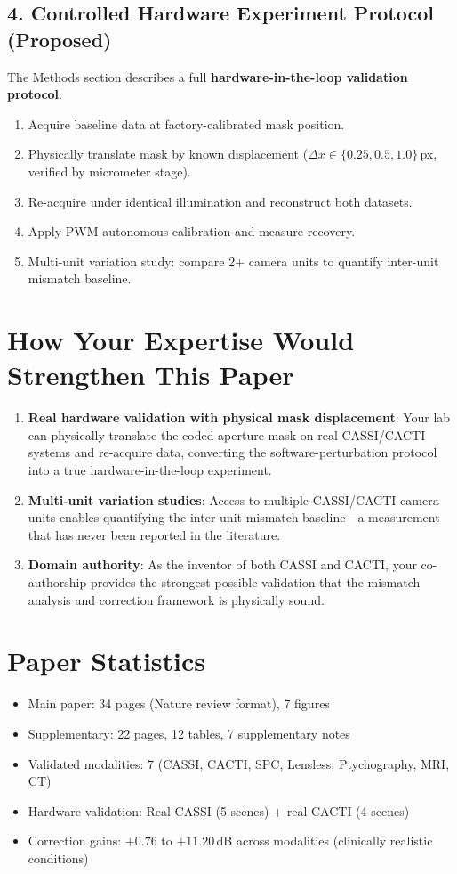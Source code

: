 \documentclass[11pt]{article}
\begin{document}
\subsection*{4. Controlled Hardware Experiment Protocol (Proposed)}

The Methods section describes a full \textbf{hardware-in-the-loop validation protocol}:
\begin{enumerate}
  \item Acquire baseline data at factory-calibrated mask position.
  \item Physically translate mask by known displacement ($\Delta x \in \{0.25, 0.5, 1.0\}$\,px, verified by micrometer stage).
  \item Re-acquire under identical illumination and reconstruct both datasets.
  \item Apply PWM autonomous calibration and measure recovery.
  \item Multi-unit variation study: compare 2+ camera units to quantify inter-unit mismatch baseline.
\end{enumerate}

\section*{How Your Expertise Would Strengthen This Paper}

\begin{enumerate}
  \item \textbf{Real hardware validation with physical mask displacement}: Your lab can physically translate the coded aperture mask on real CASSI/CACTI systems and re-acquire data, converting the software-perturbation protocol into a true hardware-in-the-loop experiment.
  \item \textbf{Multi-unit variation studies}: Access to multiple CASSI/CACTI camera units enables quantifying the inter-unit mismatch baseline---a measurement that has never been reported in the literature.
  \item \textbf{Domain authority}: As the inventor of both CASSI and CACTI, your co-authorship provides the strongest possible validation that the mismatch analysis and correction framework is physically sound.
\end{enumerate}

\section*{Paper Statistics}
\begin{itemize}
  \item Main paper: 34 pages (Nature review format), 7 figures
  \item Supplementary: 22 pages, 12 tables, 7 supplementary notes
  \item Validated modalities: 7 (CASSI, CACTI, SPC, Lensless, Ptychography, MRI, CT)
  \item Hardware validation: Real CASSI (5 scenes) + real CACTI (4 scenes)
  \item Correction gains: $+0.76$ to $+11.20$\,dB across modalities (clinically realistic conditions)
\end{itemize}
\end{document}
